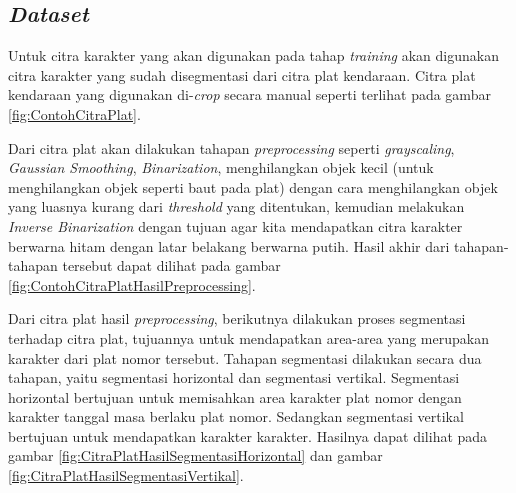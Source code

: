 \subsection{\textit{Dataset}}
\noindent Untuk citra karakter yang akan digunakan pada tahap \textit{training} akan digunakan citra karakter yang sudah disegmentasi dari citra plat kendaraan. Citra plat kendaraan yang digunakan di-\textit{crop} secara manual seperti terlihat pada gambar \ref{fig:ContohCitraPlat}.
\begin{adjustbox}{width=1\textwidth}
	\noindent
	\begin{minipage}{\linewidth}
		\label{fig:ContohCitraPlat}
	\end{minipage}
\end{adjustbox}
\noindent Dari citra plat akan dilakukan tahapan \textit{preprocessing} seperti \textit{grayscaling}, \textit{Gaussian Smoothing}, \textit{Binarization}, menghilangkan objek kecil (untuk menghilangkan objek seperti baut pada plat) dengan cara menghilangkan objek yang luasnya kurang dari \textit{threshold} yang ditentukan, kemudian melakukan \textit{Inverse Binarization} dengan tujuan agar kita mendapatkan citra karakter berwarna hitam dengan latar belakang berwarna putih. Hasil akhir dari tahapan-tahapan tersebut dapat dilihat pada gambar \ref{fig:ContohCitraPlatHasilPreprocessing}.
\begin{adjustbox}{width=1\textwidth}
	\noindent\begin{minipage}{\linewidth}
		\label{fig:ContohCitraPlatHasilPreprocessing}
	\end{minipage}
\end{adjustbox}
\noindent Dari citra plat hasil \textit{preprocessing}, berikutnya dilakukan proses segmentasi terhadap citra plat, tujuannya untuk mendapatkan area-area yang merupakan karakter dari plat nomor tersebut. Tahapan segmentasi dilakukan secara dua tahapan, yaitu segmentasi horizontal dan segmentasi vertikal. Segmentasi horizontal bertujuan untuk memisahkan area karakter plat nomor dengan karakter tanggal masa berlaku plat nomor. Sedangkan segmentasi vertikal bertujuan untuk mendapatkan karakter karakter. Hasilnya dapat dilihat pada gambar \ref{fig:CitraPlatHasilSegmentasiHorizontal} dan gambar \ref{fig:CitraPlatHasilSegmentasiVertikal}.
